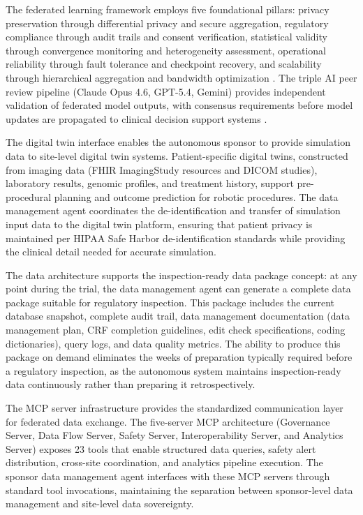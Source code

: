 The federated learning framework employs five foundational pillars: privacy preservation
through differential privacy and secure aggregation, regulatory compliance through audit
trails and consent verification, statistical validity through convergence monitoring and
heterogeneity assessment, operational reliability through fault tolerance and checkpoint
recovery, and scalability through hierarchical aggregation and bandwidth optimization
\cite{fl-paper, federated-learning-healthcare}. The triple AI peer review pipeline
(Claude Opus 4.6, GPT-5.4, Gemini) provides independent validation of federated model
outputs, with consensus requirements before model updates are propagated to clinical
decision support systems \cite{claude-opus, gpt-5-4, gemini}.

The digital twin interface enables the autonomous sponsor to provide simulation data
to site-level digital twin systems. Patient-specific digital twins, constructed from
imaging data (FHIR ImagingStudy resources and DICOM studies), laboratory results, genomic
profiles, and treatment history, support pre-procedural planning and outcome prediction
for robotic procedures. The data management agent coordinates the de-identification and
transfer of simulation input data to the digital twin platform, ensuring that
patient privacy is maintained per HIPAA Safe Harbor de-identification standards while
providing the clinical detail needed for accurate simulation.

The data architecture supports the inspection-ready data package concept: at any point
during the trial, the data management agent can generate a complete data package suitable
for regulatory inspection. This package includes the current database snapshot, complete
audit trail, data management documentation (data management plan, CRF completion
guidelines, edit check specifications, coding dictionaries), query logs, and data
quality metrics. The ability to produce this package on demand eliminates the weeks of
preparation typically required before a regulatory inspection, as the autonomous system
maintains inspection-ready data continuously rather than preparing it retrospectively.

The MCP server infrastructure \cite{mcp-repo, mcp-protocol} provides the standardized
communication layer for federated data exchange. The five-server MCP architecture
(Governance Server, Data Flow Server, Safety Server, Interoperability Server, and
Analytics Server) exposes 23 tools that enable structured data queries, safety alert
distribution, cross-site coordination, and analytics pipeline execution. The sponsor
data management agent interfaces with these MCP servers through standard tool invocations,
maintaining the separation between sponsor-level data management and site-level data
sovereignty.
